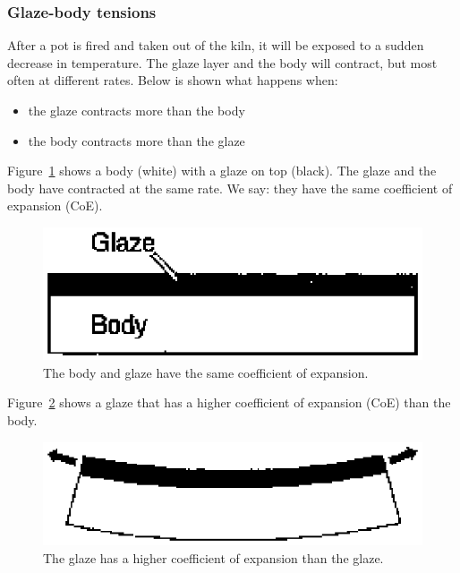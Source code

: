 \subsubsection{Glaze-body tensions}
After a pot is fired and taken out of the kiln, it will be exposed to a sudden 
decrease in temperature. The glaze layer and the body will contract, but most 
often at different rates. Below is shown what happens when:
\begin{itemize}
\item the glaze contracts more than the body
\item the body contracts more than the glaze
\end{itemize}
Figure~\ref{fig:coesame} shows a body (white) with a glaze on top (black). The 
glaze and the body have contracted at the same rate. We say: they have the same 
coefficient of expansion (CoE).
\begin{figure}[htbp!]
  \centering
  \includegraphics[width=0.6\linewidth]{img/coesame.eps}
  \caption{The body and glaze have the same coefficient of expansion.}
  \label{fig:coesame}
\end{figure}
Figure~\ref{fig:coeglaze} shows a glaze that has a higher coefficient of 
expansion (CoE) than the body.
\begin{figure}[htbp!]
  \centering
  \includegraphics[width=0.6\linewidth]{img/coeglaze.eps}
  \caption{The glaze has a higher coefficient of expansion than the glaze.}
  \label{fig:coeglaze}
\end{figure}
